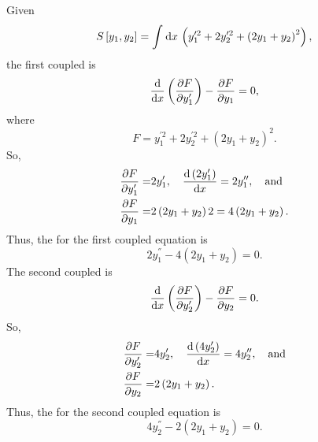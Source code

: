 \def\F{ y_1^{\prime2}  + 2y_2^{\prime2}+\left(2y_1+y_2\right)^2}%
Given
\[
	S\left[y_1,y_2\right] = \Int{}{}{x}\left( \F \right),
\]
the first coupled \el is
\[
	\ELE{F}{x}{y_{1}},
\]
where
\[
	F = \F.
\]
So,
\begin{align*}
	\pderiv{F}{y_1^\prime} =& 2y_1^\prime,\quad \deriv{\left(2y_1^\prime\right)}{x} = 2y_1^\dprime,\quad\textrm{and}\\
	\pderiv{F}{y_1}=&2\left(2y_1+y_2\right)2 = 4\left(2y_1+y_2\right).
\end{align*}
Thus, the \el for the first coupled equation is
\begin{equation}
	2y_1^\dprime - 4\left(2y_1+y_2\right) = 0.
\end{equation}
The second coupled \el is
\[
	\ELE{F}{x}{y_{2}}.
\]
So,
\begin{align*}
	\pderiv{F}{y_2^\prime} =& 4y_2^\prime,\quad \deriv{\left(4y_2^\prime\right)}{x} = 4y_2^\dprime,\quad\textrm{and}\\
	\pderiv{F}{y_2}=&2\left(2y_1+y_2\right).
\end{align*}
Thus, the \el for the second coupled equation is 
\begin{equation}
	4y_2^\dprime - 2\left(2y_1+y_2\right) = 0.
\end{equation}